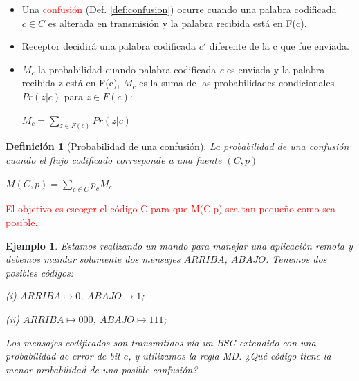 \documentclass{beamer}
\theoremstyle{plain}
\newtheorem{definicion} [Definicion]{Definición}
\theoremstyle{example}
\theoremstyle{example}
\newtheorem{ejemplo} [Ejemplo] {Ejemplo}
\begin{document}
\begin{frame}  \footnotesize
\begin{itemize} 

\item   Una \textcolor{red}{confusión} (Def. \ref{def:confusion}) ocurre cuando una palabra codificada $c \in C$ es alterada en transmisión y la palabra recibida está en F(c). 

\item  Receptor decidirá una palabra codificada $c'$ diferente de la c que fue enviada. 

\item  $M_c$ la probabilidad cuando palabra codificada \textit{c} es enviada y la palabra recibida z está en F(c), $M_c$ es la suma de las probabilidades condicionales $Pr(z | c)$ para  $z \in F (c)$:


\begin{center}
$M_c = \sum_{z \in F(c) } Pr(z | c)$ 
\end{center}
\end{itemize}
\begin{definicion}[Probabilidad de una confusión]

La probabilidad de una confusión cuando el flujo codificado corresponde a una fuente $(C,p)$

\begin{center}
$M (C,p) =  \sum_{c \in C } p_c M_c$ 
\end{center}

\end{definicion}
\vspace{0.3cm}

\textcolor{red}{El objetivo es escoger el código C para que M(C,p) sea tan pequeño como sea posible.} 
 \end{frame} 

\begin{frame}  \small  

\begin{ejemplo}
Estamos realizando un mando para manejar una aplicación remota y debemos mandar solamente dos mensajes $ARRIBA$, $ABAJO$. Tenemos dos posibles códigos:

\begin{center}
(i) $ARRIBA \mapsto 0$,  $ABAJO \mapsto 1$;   

(ii) $ARRIBA \mapsto 000$,  $ABAJO \mapsto 111$; 
\end{center}

Los mensajes codificados son transmitidos vía un BSC extendido con una probabilidad de error de bit $e$, y utilizamos la regla MD. ¿Qué código tiene la menor probabilidad de una posible confusión?
\end{ejemplo}

\end{frame} 
\end{document}
